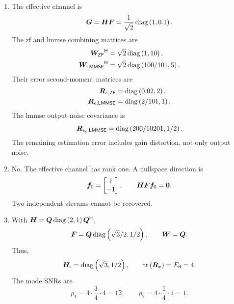 \begin{enumerate}[label=\textbf{E\arabic*.}]
	\item The effective channel is
	\begin{equation*}
		\bm{G}=\bm{H}\bm{F}
		=\frac{1}{\sqrt{2}}\operatorname{diag}\left(1,0.1\right).
	\end{equation*}
	The \ac{zf} and \ac{lmmse} combining matrices are
	\begin{align*}
		{\bm{W}_{\mathsf{ZF}}}^{\mathsf{H}}
		&=\sqrt{2}\operatorname{diag}\left(1,10\right),\\
		{\bm{W}_{\mathsf{LMMSE}}}^{\mathsf{H}}
		&=\sqrt{2}\operatorname{diag}\left(100/101,5\right).
	\end{align*}
	Their error second-moment matrices are
	\begin{align*}
		\bm{R}_{e,\mathsf{ZF}}
		&=\operatorname{diag}\left(0.02,2\right),\\
		\bm{R}_{e,\mathsf{LMMSE}}
		&=\operatorname{diag}\left(2/101,1\right).
	\end{align*}
	The \ac{lmmse} output-noise covariance is
	\begin{equation*}
		\bm{R}_{v_{\mathsf c},\mathsf{LMMSE}}
		=\operatorname{diag}\left(200/10201,1/2\right).
	\end{equation*}
	The remaining estimation error includes
	gain distortion, not only output noise.
	
	\item No. The effective channel has rank one.
	A nullspace direction is
	\begin{equation*}
		\bm{f}_0=
		\begin{bmatrix}1\\-1\end{bmatrix},
		\qquad
		\bm{H}\bm{F}\bm{f}_0=\bm{0}.
	\end{equation*}
	Two independent streams cannot be recovered.
	
	\item With $\bm{H}=\bm{Q}\operatorname{diag}\left(2,1\right){\bm{Q}}^{\mathsf{H}}$,
	\begin{equation*}
		\bm{F}
		=\bm{Q}\operatorname{diag}\left(\sqrt{3}/2,1/2\right),
		\qquad
		\bm{W}=\bm{Q}.
	\end{equation*}
	Thus,
	\begin{equation*}
		\bm{H}_{\mathsf{s}}=\operatorname{diag}\left(\sqrt{3},1/2\right),
		\qquad
		\operatorname{tr}\left(\bm{R}_x\right)=E_{\mathsf{d}}=4.
	\end{equation*}
	The mode SNRs are
	\begin{equation*}
		\rho_1=4\cdot\frac34\cdot4=12,
		\qquad
		\rho_2=4\cdot\frac14\cdot1=1.
	\end{equation*}
	

\end{enumerate}
